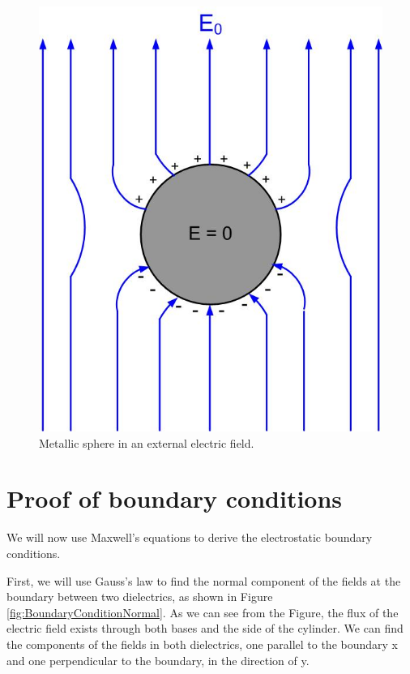\documentclass{ximera}
\begin{document}
\begin{figure}[htbp]
\begin{center}
\includegraphics[scale=0.5]{../jpg/metalsphereinefield.jpg}
\end{center}
\caption{Metallic sphere in an external electric field.}
\label{fig:BoundaryConditionMetal}
\end{figure}


\section{Proof of boundary conditions}

We will now use Maxwell's equations to derive the electrostatic boundary conditions. 

First, we will use Gauss's law to find the normal component of the fields at the boundary between two dielectrics, as shown in Figure \ref{fig:BoundaryConditionNormal}. As we can see from the Figure, the flux of the electric field exists through both bases and the side of the cylinder. We can find the components of the fields in both dielectrics, one parallel to the boundary x and one perpendicular to the boundary, in the direction of y.
\end{document}
